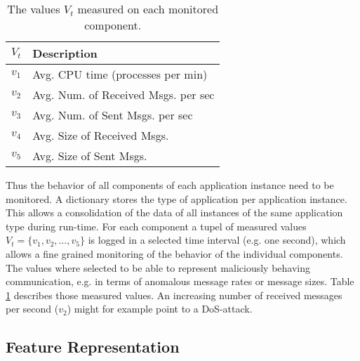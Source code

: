 \documentclass{llncs}
\begin{document}
\begin{table}[ht]
\vspace{-4mm}
\centering
\begin{tabular}{ c | l}
\textbf{$V_t$} & Description \\
\hline
\hline
$v_1$ & Avg. CPU time (processes per min)\\
\hline
$v_2$ & Avg. Num. of Received Msgs. per sec\\
\hline
$v_3$ & Avg. Num. of Sent Msgs. per sec \\
\hline
$v_4$ & Avg. Size of Received Msgs.\\
\hline
$v_5$ & Avg. Size of Sent Msgs.\\
\hline
\end{tabular}
\vspace{4mm}
\caption{The values $V_t$ measured on each monitored component.}
\vspace{-4mm}
\label{tab:componentmeasurements}
\end{table}

Thus the behavior of all components of each application instance need to be monitored. A dictionary stores the type of application per application instance. This allows a consolidation of the data of all instances of the same application type during run-time.
For each component a tupel of measured values $V_t = \{v_1, v_2, \dots , v_5\}$ is logged in a selected time interval (e.g. one second), which allows a fine grained monitoring of the behavior of the individual components. The values where selected to be able to represent maliciously behaving communication, e.g. in terms of anomalous message rates or message sizes. Table \ref{tab:componentmeasurements} describes those measured values. An increasing number of received messages per second ($v_2$) might for example point to a DoS-attack.

\subsection{Feature Representation}
\label{featurerepresentation}
\end{document}
